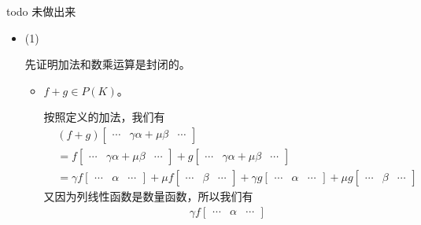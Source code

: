 \documentclass{article}
\begin{document}
todo 未做出来

\begin{itemize}
  \item (1)

        先证明加法和数乘运算是封闭的。

        \begin{itemize}
          \item $f + g \in P(K)$。

                按照定义的加法，我们有
                \begin{align*}
                   & (f + g) \begin{bmatrix}
                               \cdots & \gamma \alpha + \mu \beta & \cdots
                             \end{bmatrix}               \\
                   & = f \begin{bmatrix}
                           \cdots & \gamma \alpha + \mu \beta & \cdots
                         \end{bmatrix} + g \begin{bmatrix}
                                             \cdots & \gamma \alpha + \mu \beta & \cdots
                                           \end{bmatrix} \\
                   & = \gamma f \begin{bmatrix}
                                  \cdots & \alpha & \cdots
                                \end{bmatrix}
                  + \mu f \begin{bmatrix}
                            \cdots & \beta & \cdots
                          \end{bmatrix}
                  + \gamma g \begin{bmatrix}
                               \cdots & \alpha & \cdots
                             \end{bmatrix}
                  + \mu g \begin{bmatrix}
                            \cdots & \beta & \cdots
                          \end{bmatrix}
                \end{align*}
                又因为列线性函数是数量函数，所以我们有
                \begin{align*}
                   & \gamma f \begin{bmatrix}
                                \cdots & \alpha & \cdots

\end{bmatrix}
\end{align*}
\end{itemize}
\end{itemize}
\end{document}
